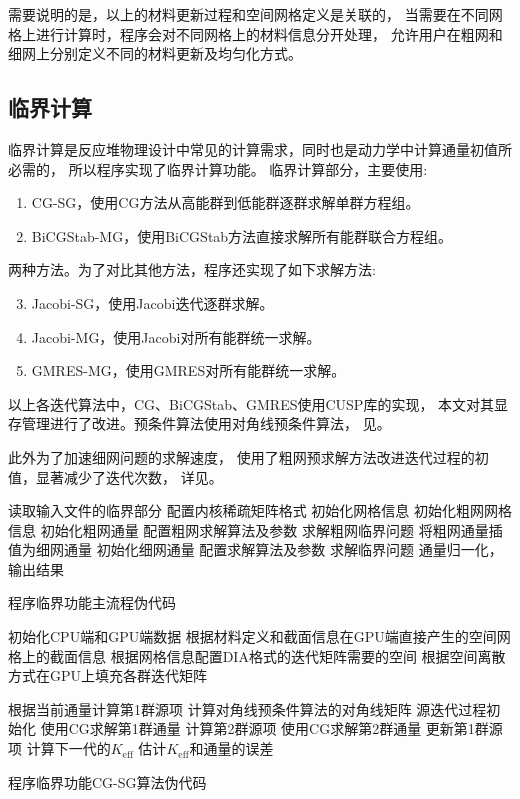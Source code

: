 需要说明的是，以上的材料更新过程和空间网格定义是关联的，
当需要在不同网格上进行计算时，程序会对不同网格上的材料信息分开处理，
允许用户在粗网和细网上分别定义不同的材料更新及均匀化方式。


\subsection{临界计算}
\label{sec:program.eigen}

临界计算是反应堆物理设计中常见的计算需求，同时也是动力学中计算通量初值所必需的，
所以\ProgramName 程序实现了临界计算功能。
临界计算部分，\ProgramName 主要使用:
\begin{enumerate}
\item CG-SG，使用CG方法从高能群到低能群逐群求解单群方程组。
\item BiCGStab-MG，使用BiCGStab方法直接求解所有能群联合方程组。
\end{enumerate}
两种方法。为了对比其他方法，程序还实现了如下求解方法:
\begin{enumerate}
\setcounter{enumi}{2}
\item Jacobi-SG，使用Jacobi迭代逐群求解。
\item Jacobi-MG，使用Jacobi对所有能群统一求解。
\item GMRES-MG，使用GMRES对所有能群统一求解。
\end{enumerate}
以上各迭代算法中，CG、BiCGStab、GMRES使用CUSP库的实现，
本文对其显存管理进行了改进。预条件算法使用对角线预条件算法，
见。

此外\ProgramName 为了加速细网问题的求解速度，
使用了粗网预求解方法改进迭代过程的初值，显著减少了迭代次数，
详见。


\begin{algorithm}
读取输入文件的临界部分 \algoend
配置内核稀疏矩阵格式\;
初始化网格信息\;
{
  初始化粗网网格信息 \algoend
  初始化粗网通量\;
  配置粗网求解算法及参数 \algoend
  求解粗网临界问题\;
  将粗网通量插值为细网通量\;
}
\Else
{
  初始化细网通量\;
}
配置求解算法及参数 \algoend
求解临界问题\;
通量归一化，输出结果\;
\caption{\label{alg:program.eigen.main}\ProgramName 程序临界功能主流程伪代码}
\end{algorithm}


\begin{algorithm}
初始化CPU端和GPU端数据\;
根据材料定义和截面信息在GPU端直接产生的空间网格上的截面信息\;
根据网格信息配置DIA格式的迭代矩阵需要的空间\;
根据空间离散方式在GPU上填充各群迭代矩阵\;

根据当前通量计算第1群源项\;
计算对角线预条件算法的对角线矩阵\;
源迭代过程初始化\;
{
  使用CG求解第1群通量 \algoend
  计算第2群源项\;
  使用CG求解第2群通量 \algoend
  更新第1群源项\;
  计算下一代的$K_\mathrm{eff}$ \algoend
  估计$K_\mathrm{eff}$和通量的误差\;
}
\caption{\label{alg:program.eigen.cg-sg}\ProgramName 程序临界功能CG-SG算法伪代码}
\end{algorithm}


